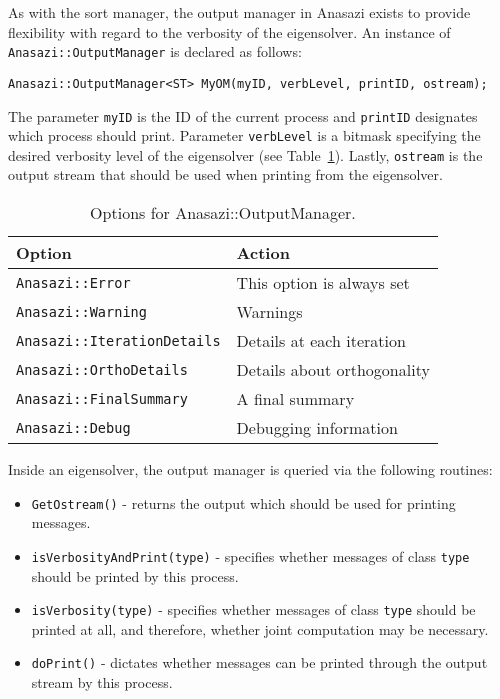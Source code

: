 As with the sort manager, the output manager in Anasazi exists to provide
flexibility with regard to the verbosity of the eigensolver. An instance of
\verb!Anasazi::OutputManager! is declared as follows:
\begin{verbatim}
Anasazi::OutputManager<ST> MyOM(myID, verbLevel, printID, ostream);
\end{verbatim}
The parameter \verb!myID! is the ID of the current process and \verb!printID! 
designates which process should print. Parameter \verb!verbLevel! is a bitmask
specifying the desired verbosity level of the eigensolver (see
Table~\ref{tab:anasazi:om}). Lastly, \verb!ostream! is the output stream that
should be used when printing from the eigensolver.

\begin{table}
\begin{center}
\begin{tabular}{| p{7cm} l |}
\hline
Option & Action \\
\hline
{\tt Anasazi::Error} & 
  This option is always set \\
{\tt Anasazi::Warning} & 
  Warnings \\
{\tt Anasazi::IterationDetails} & 
  Details at each iteration \\
{\tt Anasazi::OrthoDetails} & 
  Details about orthogonality \\
{\tt Anasazi::FinalSummary} & 
  A final summary \\
{\tt Anasazi::Debug} & 
  Debugging information \\
\hline
\end{tabular}
\caption{Options for Anasazi::OutputManager.}
\label{tab:anasazi:om}
\end{center}
\end{table}

Inside an eigensolver, the output manager is queried via the following
routines:
\begin{itemize}
\item \verb!GetOstream()! - returns the output which should be used for printing messages.
\item \verb!isVerbosityAndPrint(type)! - specifies whether messages of class
\verb!type! should be printed by this process.
\item \verb!isVerbosity(type)! - specifies whether messages of class \verb!type!
should be printed at all, and therefore, whether joint computation may be
necessary.
\item \verb!doPrint()! - dictates whether messages can be printed through the output
stream by this process.
\end{itemize}


